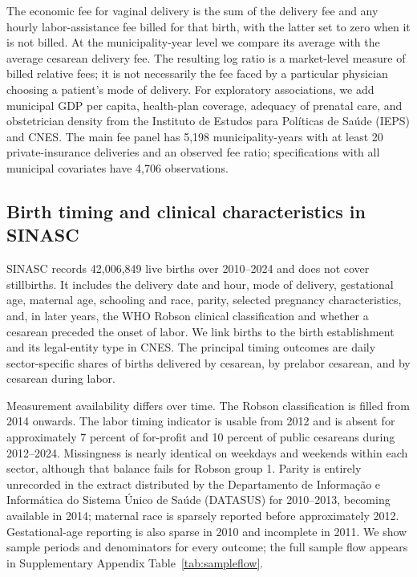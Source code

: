 \documentclass[12pt]{article}
\newcommand{\satab}[1]{Supplementary Appendix Table~\ref{#1}}
\begin{document}
The economic fee for vaginal delivery is the sum of the delivery fee and any hourly labor-assistance fee billed for that birth, with the latter set to zero when it is not billed. At the municipality-year level we compare its average with the average cesarean delivery fee. The resulting log ratio is a market-level measure of billed relative fees; it is not necessarily the fee faced by a particular physician choosing a patient's mode of delivery. For exploratory associations, we add municipal GDP per capita, health-plan coverage, adequacy of prenatal care, and obstetrician density from the Instituto de Estudos para Políticas de Saúde (IEPS) and CNES. The main fee panel has 5,198 municipality-years with at least 20 private-insurance deliveries and an observed fee ratio; specifications with all municipal covariates have 4,706 observations.

\subsection{Birth timing and clinical characteristics in SINASC}\label{sec:timing_data}

SINASC records 42,006,849 live births over 2010–2024 and does not cover stillbirths. It includes the delivery date and hour, mode of delivery, gestational age, maternal age, schooling and race, parity, selected pregnancy characteristics, and, in later years, the WHO Robson clinical classification and whether a cesarean preceded the onset of labor. We link births to the birth establishment and its legal-entity type in CNES. The principal timing outcomes are daily sector-specific shares of births delivered by cesarean, by prelabor cesarean, and by cesarean during labor.

Measurement availability differs over time. The Robson classification is filled from 2014 onwards. The labor timing indicator is usable from 2012 and is absent for approximately 7 percent of for-profit and 10 percent of public cesareans during 2012–2024. Missingness is nearly identical on weekdays and weekends within each sector, although that balance fails for Robson group 1. Parity is entirely unrecorded in the extract distributed by the Departamento de Informação e Informática do Sistema Único de Saúde (DATASUS) for 2010–2013, becoming available in 2014; maternal race is sparsely reported before approximately 2012. Gestational-age reporting is also sparse in 2010 and incomplete in 2011. We show sample periods and denominators for every outcome; the full sample flow appears in \satab{tab:sampleflow}.
\end{document}
